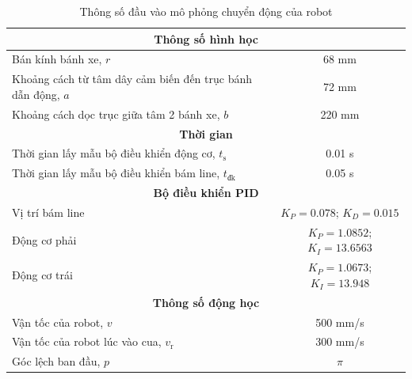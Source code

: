                \begin{table}[h]
                    \centering
                    \begin{tabular}{|l|c|}
                    \hline
                    \multicolumn{2}{|c|}{\textbf{Thông số hình học}} \\
                    \hline
                    Bán kính bánh xe, $r$ & 68 mm \\
                    \hline
                    Khoảng cách từ tâm dây cảm biến đến trục bánh dẫn động, $a$ & 72 mm \\
                    \hline
                    Khoảng cách dọc trục giữa tâm 2 bánh xe, $b$ & 220 mm \\
                    \hline
                    \multicolumn{2}{|c|}{\textbf{Thời gian}} \\
                    \hline
                    Thời gian lấy mẫu bộ điều khiển động cơ, $t_{\text{s}}$ & 0.01 s \\
                    \hline
                    Thời gian lấy mẫu bộ điều khiển bám line, $t_{\text{đk}}$ & 0.05 s \\
                    \hline
                    \multicolumn{2}{|c|}{\textbf{Bộ điều khiển PID}} \\
                    \hline
                    Vị trí bám line & $K_P = 0.078$; $K_D = 0.015$ \\
                    \hline
                    Động cơ phải & $K_P = 1.0852$; $K_I = 13.6563$ \\
                    \hline
                    Động cơ trái & $K_P = 1.0673$; $K_I = 13.948$ \\
                    \hline
                    \multicolumn{2}{|c|}{\textbf{Thông số động học}} \\
                    \hline
                    Vận tốc của robot, $v$ & 500 mm/s \\
                    \hline
                    Vận tốc của robot lúc vào cua, $v_{\text{r}}$ & 300 mm/s \\
                    \hline
                    Góc lệch ban đầu, $p$ & $\pi$ \\
                    \hline
                    \end{tabular}
                    \label{tab:robot_specifications}
                    \caption{Thông số đầu vào mô phỏng chuyển động của robot}
               \end{table}
